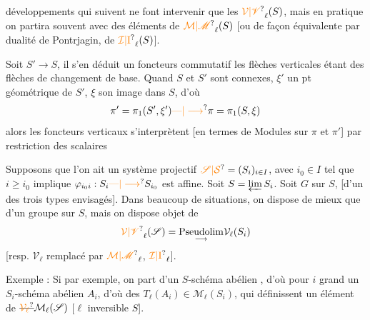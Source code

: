 développements qui suivent ne font intervenir que les $\unsure{\mathcal V|\mathscr V}_\ell(S)$, mais en pratique on partira souvent avec des éléments de $\unsure{\mathcal M|\mathscr M}_\ell(S)$ [ou de façon équivalente par dualité de Pontrjagin, de $\unsure{\mathcal I|\mathrm I}_\ell(S)$].

Soit $S'\longrightarrow S$, il s'en déduit un  foncteurs  commutatif
les flèches verticales étant des flèches de changement de base. Quand $S$ et $S'$ sont connexes, $\xi'$ un pt géométrique de $S'$, $\xi$ son image dans $S$, d'où
\[
\pi'=\pi_1(S',\xi')\unsure{\text{---}|\longrightarrow}\pi=\pi_1(S,\xi)
\]
alors les foncteurs verticaux s'interprètent [en termes de  Modules sur $\pi$ et $\pi'$] par restriction des scalaires

Supposons que l'on ait un système projectif $\unsure{\mathscr S|\mathcal S}=(S_i)_{i\in I}$, avec $i_0\in I$ tel que $i\geq i_0$ implique $\varphi_{i_0i}:S_i\unsure{\text{---}|\longrightarrow}S_{i_0}$ est affine. Soit $S=\varprojlim S_i$. Soit $G$ sur $S$, [d'un des trois types envisagés]. Dans beaucoup de situations, on dispose de mieux que d'un groupe sur $S$, mais on dispose  objet de
\[
\unsure{\mathcal V|\mathscr V}_\ell(\mathscr S)=\underset{\longrightarrow}{\operatorname{Pseudolim}}\mathcal V_\ell(S_i)
\]
[resp.  $\mathcal V_\ell$ remplacé par $\unsure{\mathcal M|\mathscr M}_\ell$, $\unsure{\mathcal I|\mathrm I}_\ell$].

Exemple : Si par exemple, on part d'un  $S$-schéma abélien , d'où pour $i$ grand un $S_i$-schéma abélien $A_i$, d'où des $T_\ell(A_i)\in\mathcal M_\ell(S_i)$, qui définissent un élément de $\deleted{\unsure{\mathcal V_\ell}}\mathcal M_\ell(\mathscr S)$ [$\ell$ inversible  $S$].

